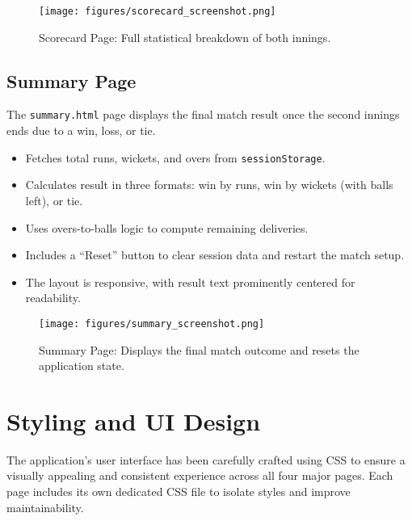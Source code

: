\documentclass[a4paper,10pt]{article}
\begin{document}
\begin{figure}[H]
    \centering
    \texttt{[image: figures/scorecard\_screenshot.png]}
    \caption{Scorecard Page: Full statistical breakdown of both innings.}
    \label{fig:scorecard}
\end{figure}


\subsection{Summary Page}
The \texttt{summary.html} page displays the final match result once the second innings ends due to a win, loss, or tie.

\begin{itemize} \item Fetches total runs, wickets, and overs from \texttt{sessionStorage}. \item Calculates result in three formats: win by runs, win by wickets (with balls left), or tie. \item Uses overs-to-balls logic to compute remaining deliveries. \item Includes a “Reset” button to clear session data and restart the match setup. \item The layout is responsive, with result text prominently centered for readability. \end{itemize}

\begin{figure}[H]
    \centering
    \texttt{[image: figures/summary\_screenshot.png]}
    \caption{Summary Page: Displays the final match outcome and resets the application state.}
    \label{fig:summary}
\end{figure}


\section{Styling and UI Design}

The application's user interface has been carefully crafted using CSS to ensure a visually appealing and consistent experience across all four major pages. Each page includes its own dedicated CSS file to isolate styles and improve maintainability.
\end{document}
